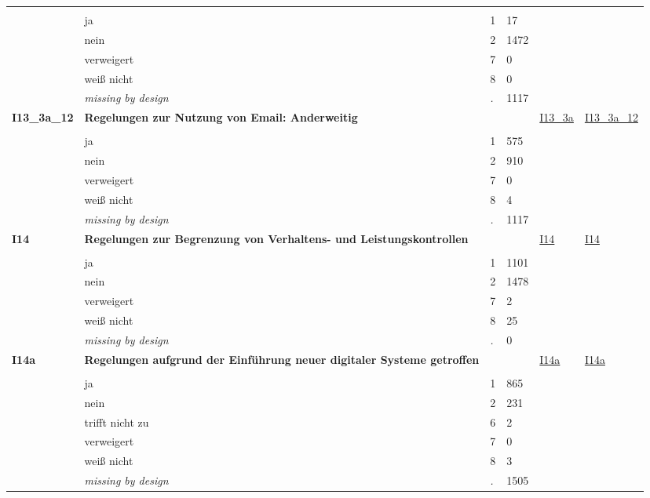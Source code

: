 \begin{longtable}{| L{2.45cm} | L{6cm} | C{1.5cm} | R{1cm} | C{2.25cm} | C{2.25cm} |}
   &  &  &  &  &  \\ 
   & ja & 1 & 17 &  &  \\ 
   & nein & 2 & 1472 &  &  \\ 
   & verweigert & 7 & 0 &  &  \\ 
   & weiß nicht & 8 & 0 &  &  \\ 
   & \textit{missing by design} & \textit{.} & 1117 &  &  \\ 
   \midrule
\textbf{I13\_3a\_12}\label{var:I13:3a:12} & \textbf{Regelungen zur Nutzung von Email: Anderweitig} &  &  & \hyperref[I13:3a]{I13\_3a} & \hyperref[var:suf:I13:3a:12]{I13\_3a\_12} \\ 
   &  &  &  &  &  \\ 
   & ja & 1 & 575 &  &  \\ 
   & nein & 2 & 910 &  &  \\ 
   & verweigert & 7 & 0 &  &  \\ 
   & weiß nicht & 8 & 4 &  &  \\ 
   & \textit{missing by design} & \textit{.} & 1117 &  &  \\ 
   \midrule
\textbf{I14}\label{var:I14} & \textbf{Regelungen zur Begrenzung von Verhaltens- und Leistungskontrollen} &  &  & \hyperref[I14]{I14} & \hyperref[var:suf:I14]{I14} \\ 
   &  &  &  &  &  \\ 
   & ja & 1 & 1101 &  &  \\ 
   & nein & 2 & 1478 &  &  \\ 
   & verweigert & 7 & 2 &  &  \\ 
   & weiß nicht & 8 & 25 &  &  \\ 
   & \textit{missing by design} & \textit{.} & 0 &  &  \\ 
   \midrule
\textbf{I14a}\label{var:I14a} & \textbf{Regelungen aufgrund der Einführung neuer digitaler Systeme getroffen} &  &  & \hyperref[I14a]{I14a} & \hyperref[var:suf:I14a]{I14a} \\ 
   &  &  &  &  &  \\ 
   & ja & 1 & 865 &  &  \\ 
   & nein & 2 & 231 &  &  \\ 
   & trifft nicht zu & 6 & 2 &  &  \\ 
   & verweigert & 7 & 0 &  &  \\ 
   & weiß nicht & 8 & 3 &  &  \\ 
   & \textit{missing by design} & \textit{.} & 1505 &  &  \\ 

\end{longtable}
